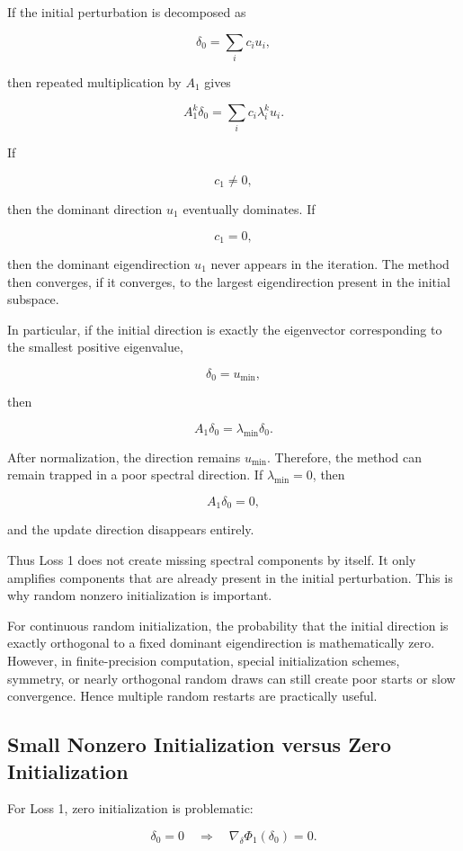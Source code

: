 \documentclass{article}
\begin{document}
If the initial perturbation is decomposed as

\[
\delta_0=\sum_i c_i u_i,
\]

then repeated multiplication by \(A_1\) gives

\[
A_1^k\delta_0
=
\sum_i c_i\lambda_i^k u_i.
\]

If

\[
c_1\neq0,
\]

then the dominant direction \(u_1\) eventually dominates. If

\[
c_1=0,
\]

then the dominant eigendirection \(u_1\) never appears in the iteration. The method then converges, if it converges, to the largest eigendirection present in the initial subspace.

In particular, if the initial direction is exactly the eigenvector corresponding to the smallest positive eigenvalue,

\[
\delta_0=u_{\min},
\]

then

\[
A_1\delta_0
=
\lambda_{\min}\delta_0.
\]

After normalization, the direction remains \(u_{\min}\). Therefore, the method can remain trapped in a poor spectral direction. If \(\lambda_{\min}=0\), then

\[
A_1\delta_0=0,
\]

and the update direction disappears entirely.

Thus Loss 1 does not create missing spectral components by itself. It only amplifies components that are already present in the initial perturbation. This is why random nonzero initialization is important.

For continuous random initialization, the probability that the initial direction is exactly orthogonal to a fixed dominant eigendirection is mathematically zero. However, in finite-precision computation, special initialization schemes, symmetry, or nearly orthogonal random draws can still create poor starts or slow convergence. Hence multiple random restarts are practically useful.

\subsection{Small Nonzero Initialization versus Zero Initialization}

For Loss 1, zero initialization is problematic:

\[
\delta_0=0
\quad\Rightarrow\quad
\nabla_\delta \Phi_1(\delta_0)=0.
\]
\end{document}
